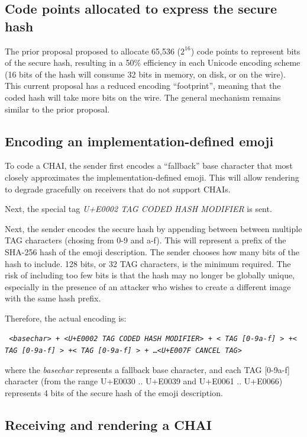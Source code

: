 \documentclass[12pt]{article}
\begin{document}
\subsection{Code points allocated to express the secure hash}

The prior proposal proposed to allocate 65,536 ($2^{16}$) code points to represent bits
of the secure hash, resulting in a 50\% efficiency in each Unicode encoding scheme (16 bits of
the hash will consume 32 bits in memory, on disk, or on the wire)\autocite{L216105}. This current proposal has a reduced encoding ``footprint'', meaning that the coded hash will take more bits
on the wire. The general mechanism remains similar to the prior proposal.

\subsection{Encoding an implementation-defined emoji}

To code a CHAI, the sender first encodes a ``fallback'' base character
that most closely approximates the implementation-defined emoji. This
will allow rendering to degrade gracefully on receivers that do not
support CHAIs.

Next, the special tag \textit{U+E0002 TAG CODED HASH MODIFIER} is sent.

Next, the sender encodes the secure hash by appending between between
multiple TAG characters (chosing from 0-9 and a-f). This will represent a prefix of the
SHA-256 hash of the emoji description. The sender chooses how many
bits of the hash to include. 128 bits, or 32 TAG
characters, is the minimum required. The risk of
including too few bits is that the hash may no longer be globally unique,
especially in the presence of an attacker who wishes to create a different
image with the same hash prefix.



Therefore, the actual encoding is:

\texttt { <\textit{basechar}> + <\textit{U+E0002 TAG CODED HASH MODIFIER}> + <\textit{ TAG [0-9a-f] }> +<\textit{ TAG [0-9a-f] }> +<\textit{ TAG [0-9a-f] }> + \ldots <\textit{U+E007F CANCEL TAG}> }

where the \textit{basechar} represents a fallback base character, and
each TAG [0-9a-f] character (from the range U+E0030 .. U+E0039 and U+E0061
.. U+E0066) represents 4 bits of the secure hash of the emoji
description.

\subsection{Receiving and rendering a CHAI}
\end{document}
